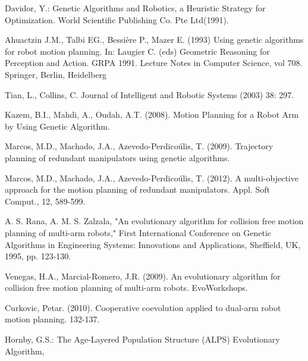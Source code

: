 \documentclass[12pt]{article} %
\begin{document}
\begin{thebibliography}{99}
Davidor, Y.: Genetic Algorithms and Robotics, a Heuristic Strategy for Optimization. World Scientific Publishing Co. Pte Ltd(1991).

Ahuactzin J.M., Talbi EG., Bessière P., Mazer E. (1993) Using genetic algorithms for robot motion planning. In: Laugier C. (eds) Geometric Reasoning for Perception and Action. GRPA 1991. Lecture Notes in Computer Science, vol 708. Springer, Berlin, Heidelberg

Tian, L., Collins, C. Journal of Intelligent and Robotic Systems (2003) 38: 297. 

Kazem, B.I., Mahdi, A., Oudah, A.T. (2008). Motion Planning for a Robot Arm by Using Genetic Algorithm.

Marcos, M.D., Machado, J.A., Azevedo-Perdicoúlis, T. (2009). Trajectory planning of redundant manipulators using genetic algorithms.

Marcos, M.D., Machado, J.A., Azevedo-Perdicoúlis, T. (2012). A multi-objective approach for the motion planning of redundant manipulators. Appl. Soft Comput., 12, 589-599.

A. S. Rana, A. M. S. Zalzala, "An evolutionary algorithm for collision free motion planning of multi-arm robots," First International Conference on Genetic Algorithms in Engineering Systems: Innovations and Applications, Sheffield, UK, 1995, pp. 123-130.

Venegas, H.A., Marcial-Romero, J.R. (2009). An evolutionary algorithm for collision free motion planning of multi-arm robots. EvoWorkshops.

Curkovic, Petar. (2010). Cooperative coevolution applied to dual-arm robot motion planning. 132-137. 

Hornby, G.S.: The Age-Layered Population Structure (ALPS) Evolutionary Algorithm, 


\end{thebibliography}

\end{document}
